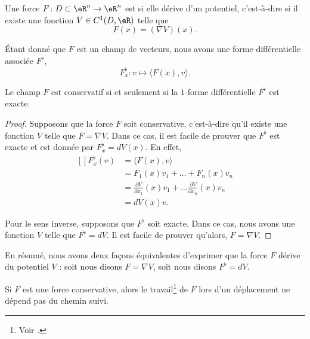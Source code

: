 \begin{definition}
	Une force \( F\colon D\subset\eR^n\to \eR^n\) est  si elle dérive d'un potentiel, c'est-à-dire si il existe une fonction \( V\in C^1(D,\eR)\) telle que
	\begin{equation}
		F(x)=(\nabla V)(x).
	\end{equation}
\end{definition}
Étant donné que \( F\) est un champ de vecteurs, nous avons une forme différentielle associée \( F^{\flat}\),
\begin{equation}
	F^{\flat}_x\colon v\mapsto \langle F(x), v\rangle .
\end{equation}

\begin{lemma}
	Le champ \( F\) est conservatif si et seulement si la \( 1\)-forme différentielle \( F^{\flat}\) est exacte.
\end{lemma}

\begin{proof}
	Supposons que la force \( F\) soit conservative, c'est-à-dire qu'il existe une fonction \( V\) telle que \( F=\nabla V\). Dans ce cas, il est facile de prouver que \( F^{\flat}\) est exacte et est donnée par \( F_x^{\flat}=dV(x)\). En effet,
	\begin{equation}
		\begin{aligned}[]
			F_x^{\flat}(v) & =\langle F(x), v\rangle                                                                    \\
			               & =F_1(x)v_1+\ldots+F_n(x)v_n                                                                \\
			               & =\frac{ \partial V }{ \partial x_1 }(x)v_1+\ldots\frac{ \partial V }{ \partial x_n }(x)v_n \\
			               & =dV(x)v.
		\end{aligned}
	\end{equation}

	Pour le sens inverse, supposons que \( F^{\flat}\) soit exacte. Dans ce cas, nous avons une fonction \( V\) telle que \( F^{\flat}=dV\). Il est facile de prouver qu'alors, \( F=\nabla V\).
\end{proof}
En résumé, nous avons deux façons équivalentes d'exprimer que la force \( F\) dérive du potentiel \( V\) :  soit nous disons \( F=\nabla V\), soit nous disons \( F^{\flat}=dV\).

\begin{proposition}
	Si \( F\) est une force conservative, alors le travail\footnote{Voir \cite{BIBooTQWKooHJKzlk}.} de \( F\) lors d'un déplacement ne dépend pas du chemin suivi.
\end{proposition}

